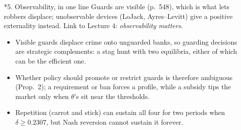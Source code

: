 \documentclass[10pt,a4paper]{article}
\makeatletter
\renewcommand\section{\@startsection{section}{1}{\z@}{6pt plus 2pt}{2pt}{\normalfont\large\bfseries}}
\makeatother
\begin{document}
\section*{5. Observability, in one line}
Guards are visible (p.\ 548), which is what lets robbers displace; unobservable devices (LoJack, Ayres--Levitt) give a positive
externality instead. Link to Lecture 4: \emph{observability matters}.

\begin{tcolorbox}[colback=ans!5,colframe=ans,boxrule=0.6pt,left=5pt,right=5pt,top=3pt,bottom=3pt,title={Takeaway}]
\begin{itemize}[leftmargin=1.2em]
  \item Visible guards displace crime onto unguarded banks, so guarding decisions are strategic complements: a stag hunt with two equilibria, either of which can be the efficient one.
  \item Whether policy should promote or restrict guards is therefore ambiguous (Prop.\ 2); a requirement or ban forces a profile, while a subsidy tips the market only when $\theta$'s sit near the thresholds.
  \item Repetition (carrot and stick) can sustain all four for two periods when $\delta\ge0.2307$, but Nash reversion cannot sustain it forever.
\end{itemize}
\end{tcolorbox}
\end{document}
